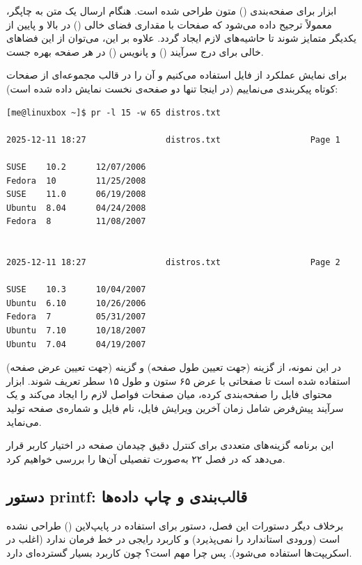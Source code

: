 ابزار  برای صفحه‌بندی () متون طراحی شده است. هنگام ارسال یک متن به چاپگر، معمولاً ترجیح داده می‌شود که صفحات با مقداری فضای خالی () در بالا و پایین از یکدیگر متمایز شوند تا حاشیه‌های لازم ایجاد گردد. علاوه بر این، می‌توان از این فضاهای خالی برای درج سرآیند () و پانویس () در هر صفحه بهره جست.

برای نمایش عملکرد  از فایل  استفاده می‌کنیم و آن را در قالب مجموعه‌ای از صفحات کوتاه پیکربندی می‌نماییم (در اینجا تنها دو صفحه‌ی نخست نمایش داده شده است):

\begin{latin}
\begin{lstlisting}
[me@linuxbox ~]$ pr -l 15 -w 65 distros.txt

2025-12-11 18:27                distros.txt                  Page 1

SUSE    10.2      12/07/2006
Fedora  10        11/25/2008
SUSE    11.0      06/19/2008
Ubuntu  8.04      04/24/2008
Fedora  8         11/08/2007


2025-12-11 18:27                distros.txt                  Page 2

SUSE    10.3      10/04/2007
Ubuntu  6.10      10/26/2006
Fedora  7         05/31/2007
Ubuntu  7.10      10/18/2007
Ubuntu  7.04      04/19/2007
\end{lstlisting}
\end{latin}

در این نمونه، از گزینه  (جهت تعیین طول صفحه) و گزینه  (جهت تعیین عرض صفحه) استفاده شده است تا صفحاتی با عرض ۶۵ ستون و طول ۱۵ سطر تعریف شوند. ابزار  محتوای فایل را صفحه‌بندی کرده، میان صفحات فواصل لازم را ایجاد می‌کند و یک سرآیند پیش‌فرض شامل زمان آخرین ویرایش فایل، نام فایل و شماره‌ی صفحه تولید می‌نماید.

این برنامه گزینه‌های متعددی برای کنترل دقیق چیدمان صفحه در اختیار کاربر قرار می‌دهد که در فصل ۲۲ به‌صورت تفصیلی آن‌ها را بررسی خواهیم کرد.

\subsection{دستور printf: قالب‌بندی و چاپ داده‌ها}

برخلاف دیگر دستورات این فصل، دستور  برای استفاده در پایپ‌لاین () طراحی نشده است (ورودی استاندارد را نمی‌پذیرد) و کاربرد رایجی در خط فرمان ندارد (اغلب در اسکریپت‌ها استفاده می‌شود). پس چرا مهم است؟ چون کاربرد بسیار گسترده‌ای دارد.

